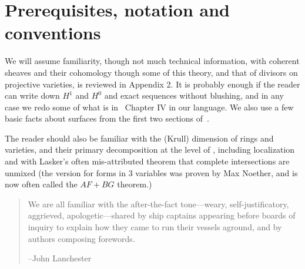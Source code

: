 \section{Prerequisites, notation and conventions}

We will assume familiarity, though not much technical information, with coherent sheaves and their cohomology though some of this theory, and that of divisors on projective 
varieties, is reviewed in Appendix 2. It is probably enough if the reader can write down $H^1$ and $H^0$ and exact sequences without blushing, and in any case we redo some of what is in~\cite[Chapter IV]{Hartshorne1977}  Chapter IV in our language. We also use a few basic facts about surfaces from the first two sections of~\cite[Chapter IV]{Hartshorne1977}.

The reader should also be familiar with the (Krull) dimension of rings and varieties, and their primary decomposition at the level of \cite{Atiyah-MacDonald}, including localization and with Lasker's often mis-attributed theorem that complete intersections are unmixed (the version for forms in 3 variables was proven by
Max Noether, and is now often called the $AF+BG$ theorem.)




\begin{quote}
\small\sf
We are all familiar with the after-the-fact tone---weary, self-justificatory, aggrieved, apologetic---shared by ship captains appearing before boards of inquiry to explain how they came to run their vessels aground, and by authors composing forewords.

--John Lanchester 
\bigskip

\end{quote}



\



